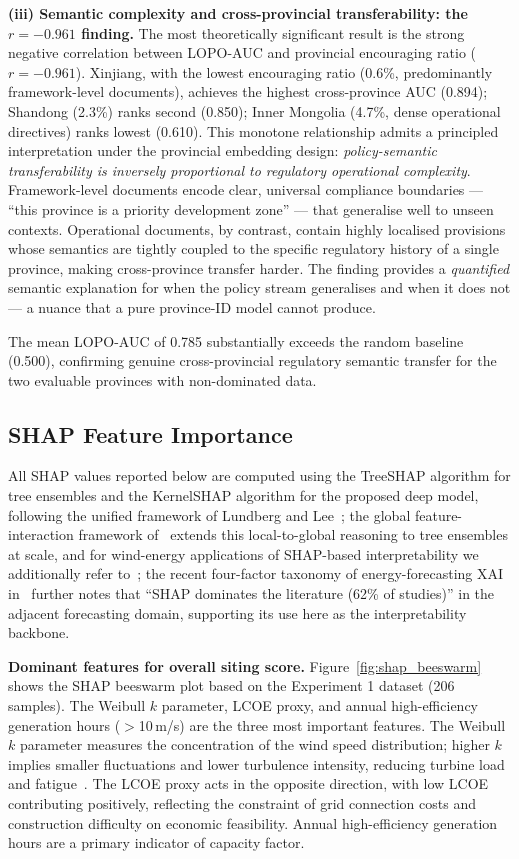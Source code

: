 \documentclass[12pt, a4paper]{article}
\begin{document}
\textbf{(iii) Semantic complexity and cross-provincial
transferability: the $r=-0.961$ finding.}
The most theoretically significant result is the strong
negative correlation between LOPO-AUC and provincial
encouraging ratio ($r=-0.961$). Xinjiang, with the lowest
encouraging ratio (0.6\%, predominantly framework-level
documents), achieves the highest cross-province AUC
(0.894); Shandong (2.3\%) ranks second (0.850); Inner
Mongolia (4.7\%, dense operational directives) ranks
lowest (0.610). This monotone relationship admits a
principled interpretation under the provincial embedding
design: \textit{policy-semantic transferability is inversely
proportional to regulatory operational complexity}. Framework-level documents
encode clear, universal compliance boundaries ---
``this province is a priority development zone'' --- that
generalise well to unseen contexts. Operational documents,
by contrast, contain highly localised provisions whose
semantics are tightly coupled to the specific regulatory
history of a single province, making cross-province
transfer harder. The finding provides a \textit{quantified}
semantic explanation for when the policy stream
generalises and when it does not --- a nuance that a pure
province-ID model cannot produce.

The mean LOPO-AUC of 0.785 substantially exceeds the
random baseline (0.500), confirming genuine cross-provincial
regulatory semantic transfer for the two evaluable
provinces with non-dominated data.

\subsection{SHAP Feature Importance}
\label{sec:shap}

All SHAP values reported below are computed using the
TreeSHAP algorithm for tree ensembles and the KernelSHAP
algorithm for the proposed deep model, following the
unified framework of
Lundberg and Lee~\cite{lundberg2017}; the global feature-
interaction framework of~\cite{lundberg2020} extends this
local-to-global reasoning to tree ensembles at scale, and for
wind-energy applications of SHAP-based interpretability we
additionally refer to~\cite{bilgili2024xai,shadi2025xai}; the
recent four-factor taxonomy of energy-forecasting XAI
in~\cite{arabzadeh2025xai} further notes that
``SHAP dominates the literature (62\% of studies)'' in the
adjacent forecasting domain, supporting its use here as the
interpretability backbone.

\textbf{Dominant features for overall siting score.}
Figure~\ref{fig:shap_beeswarm} shows the SHAP beeswarm plot
based on the Experiment 1 dataset (206 samples). The Weibull
$k$ parameter, LCOE proxy, and annual high-efficiency
generation hours ($>$10\,m/s) are the three most important
features. The Weibull $k$ parameter measures the concentration
of the wind speed distribution; higher $k$ implies smaller
fluctuations and lower turbulence intensity, reducing turbine
load and fatigue~\cite{jung2021}. The LCOE proxy acts in
the opposite direction, with low LCOE contributing positively,
reflecting the constraint of grid connection costs and
construction difficulty on economic feasibility. Annual high-efficiency generation hours are a primary
indicator of capacity factor.
\end{document}
